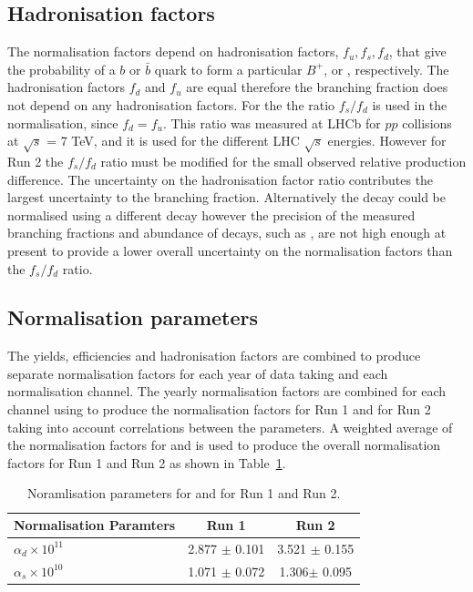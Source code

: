 {{\subsection{Hadronisation factors}

The normalisation factors depend on hadronisation factors, $f_{u}, f_{s}, f_{d}$, that give the probability of a $b$ or $\bar{b}$ quark to form a particular $B^{+}$, \bs or \bd, respectively. The hadronisation factors $f_{d}$ and $f_{u}$ are equal therefore the \bdmumu branching fraction does not depend on any hadronisation factors. For the \bsmumu the ratio $f_{s}/f_{d}$ is used in the normalisation, since $f_{d} = f_{u}$. This ratio was measured at LHCb for $pp$ collisions at $\sqrt{s}$ = 7 TeV, and it is used for the different LHC $\sqrt{s}$ energies. However for Run 2 the $f_{s}/f_{d}$ ratio must be modified for the small observed relative production difference. 
The uncertainty on the hadronisation factor ratio contributes the largest uncertainty to the \bsmumu branching fraction. Alternatively the \bsmumu decay could be normalised using a different \bs decay however the precision of the measured branching fractions and abundance of \bs decays, such as \bsjpsiphi, are not high enough at present to provide a lower overall uncertainty on the normalisation factors than the $f_{s}/f_{d}$ ratio.

\subsection{Normalisation parameters}

The yields, efficiencies and hadronisation factors are combined to produce separate normalisation factors for each year of data taking and each normalisation channel. The yearly normalisation factors are combined for each channel using to produce the normalisation factors for Run 1 and for Run 2 taking into account correlations between the parameters. A weighted average of the normalisation factors for \bdkpi and \bujpsiK is used to produce the overall normalisation factors for Run 1 and Run 2 as shown in Table~\ref{tab:normparams}.

\begin{table}[htbp]
\begin{center}
\begin{tabular}{lcc}
\hline
Normalisation Paramters & Run 1 & Run 2 \\ \hline
$\alpha_{d} \times 10^{11}$ & 2.877 $\pm$ 0.101 & 3.521 $\pm$ 0.155 \\ %
$\alpha_{s} \times 10^{10}$ & 1.071 $\pm$ 0.072 & 1.306$ \pm$ 0.095 \\
\hline
\end{tabular}
\vspace{0.7cm}
\caption{Noramlisation parameters for \bsmumu and \bdmumu for Run 1 and Run 2.}
\label{tab:normparams}
\end{center}
\end{table}


}}
